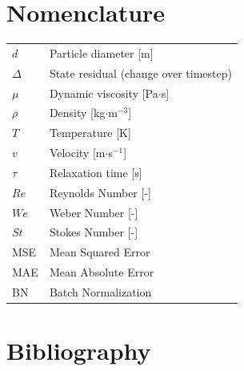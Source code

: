 \documentclass[letterpaper,twocolumn,10pt]{article}
\begin{document}
\section*{Nomenclature}
\noindent
\begin{tabular}{ll}
$d$ & Particle diameter [m] \\
$\Delta$ & State residual (change over timestep) \\
$\mu$ & Dynamic viscosity [Pa$\cdot$s] \\
$\rho$ & Density [kg$\cdot$m$^{-3}$] \\
$T$ & Temperature [K] \\
$v$ & Velocity [m$\cdot$s$^{-1}$] \\
$\tau$ & Relaxation time [s] \\
$Re$ & Reynolds Number [-] \\
$We$ & Weber Number [-] \\
$St$ & Stokes Number [-] \\
MSE & Mean Squared Error \\
MAE & Mean Absolute Error \\
BN & Batch Normalization \\
\end{tabular}

\section*{Bibliography}
\end{document}
